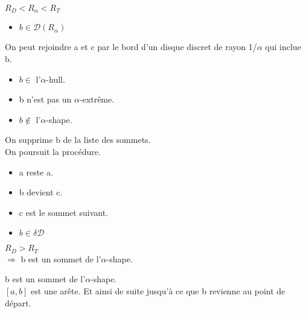 \documentclass{beamer}
\begin{document}
\begin{frame}
\begin{columns}[t]
\begin{column}{3cm}
\begin{block}{}
{          \alert{$R_D < R_{\alpha} < R_T$}\\
        }
        {
          \begin{itemize}
            \item $b \in \mathcal{D} \left( R_{\alpha} \right)$
          \end{itemize}
          On peut rejoindre a et c par le bord d'un disque discret de rayon 1/$\alpha$ qui inclue b.
        }
        {
          \begin{itemize}
            \item $b \in$ l'$\alpha$-hull.
            \item b n'est pas un $\alpha$-extrême.
            \item $b \notin$ l'$\alpha$-shape.
          \end{itemize}
        }
        {
          On supprime b de la liste des sommets.\\
          On poursuit la procédure.\\
        }
        {
          \begin{itemize}
            \item a reste a.
            \item b devient c.
            \item c est le sommet suivant.
          \end{itemize}
        }
        {
          \begin{itemize}
            \item $b \in \delta \mathcal{D}$

          \end{itemize}
          $R_D > R_T$\\
          $\Rightarrow$ b est un sommet de l'$\alpha$-shape.\\
          
        }
        {
          b est un sommet de l'$\alpha$-shape.\\
          $[a, b]$ est une arête.
        }
        {
          Et ainsi de suite jusqu'à ce que b revienne au point de départ.\\
        }
      \end{block}
    \end{column}
  \end{columns} 

\end{frame}
\end{document}

